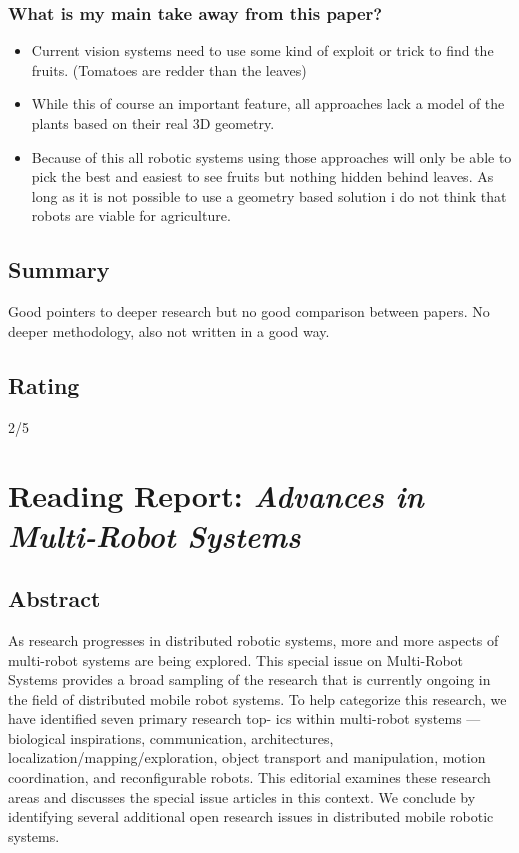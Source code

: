 \subsubsection*{What is my main take away from this paper?}
\begin{itemize}
    \item Current vision systems need to use some kind of exploit or trick to find the fruits. (Tomatoes are redder than the leaves) 
    \item While this of course an important feature, all approaches lack a model of the plants based on their real 3D geometry. 
    \item Because of this all robotic systems using those approaches will only be able to pick the best and easiest to see fruits but nothing hidden behind leaves. As long as it is not possible to use a geometry based solution i do not think that robots are viable for agriculture.
\end{itemize}

\subsection*{Summary}
Good pointers to deeper research but no good comparison between papers. No deeper methodology, also not written in a good way.
\subsection*{Rating}
2/5


\section{Reading Report: \emph{Advances in Multi-Robot Systems}}
\cite{Arai2002}

\subsection*{Abstract}
As research progresses in distributed robotic systems, more and more aspects of multi-robot systems are being
explored. This special issue on Multi-Robot Systems provides
a broad sampling of the research that is currently ongoing in
the field of distributed mobile robot systems. To help categorize this research, we have identified seven primary research top-
ics within multi-robot systems — biological inspirations, communication, architectures, localization/mapping/exploration, object
transport and manipulation, motion coordination, and reconfigurable robots. This editorial examines these research areas and
discusses the special issue articles in this context. We conclude by
identifying several additional open research issues in distributed
mobile robotic systems.


